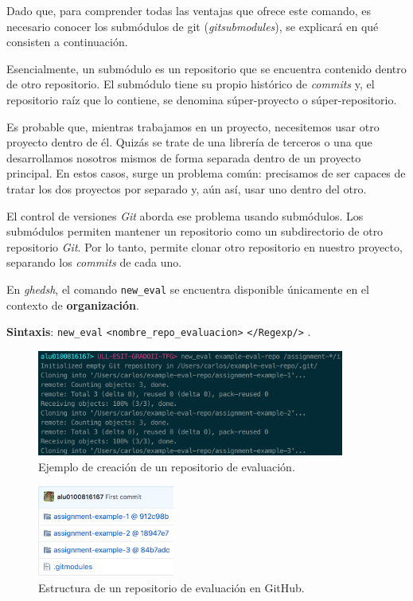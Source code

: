 Dado que, para comprender todas las ventajas que ofrece este comando, es necesario conocer los submódulos de git ({\it gitsubmodules\cite{B28}}), se explicará en qué consisten a continuación.
\bigskip

Esencialmente, un submódulo es un repositorio que se encuentra contenido dentro de otro repositorio. El submódulo tiene su propio histórico de {\it commits} y, el repositorio raíz que lo contiene, se denomina súper-proyecto o súper-repositorio.
\bigskip

Es probable que, mientras trabajamos en un proyecto, necesitemos usar otro proyecto dentro de él. Quizás se trate de una librería de terceros o una que desarrollamos nosotros mismos de forma separada dentro de un proyecto principal. En estos casos, surge un problema común:
precisamos de ser capaces de tratar los dos proyectos por separado y, aún así, usar uno dentro del otro.
\bigskip

El control de versiones {\it Git} aborda ese problema usando submódulos. Los submódulos permiten mantener un repositorio como un subdirectorio de otro repositorio {\it Git}. Por lo tanto, permite clonar otro repositorio en nuestro proyecto, separando los {\it commits} de cada uno.
\bigskip

En {\it ghedsh}, el comando \verb|new_eval| se encuentra disponible únicamente en el contexto de \textbf{organización}.

\textbf{Sintaxis}: \verb|new_eval| \verb|<nombre_repo_evaluacion>| \verb|</Regexp/>| .

\begin{figure}[H]
	\begin{center}
	\includegraphics[width=0.9\textwidth]{images/eval-example.png}
	\caption{Ejemplo de creación de un repositorio de evaluación.}
	\label{fig:eval-example}
	\end{center}
\end{figure}

\begin{figure}[H]
	\begin{center}
	\includegraphics[width=0.4\textwidth]{images/eval-preview.png}
	\caption{Estructura de un repositorio de evaluación en GitHub.}
	\label{fig:eval-example}
	\end{center}
\end{figure}

